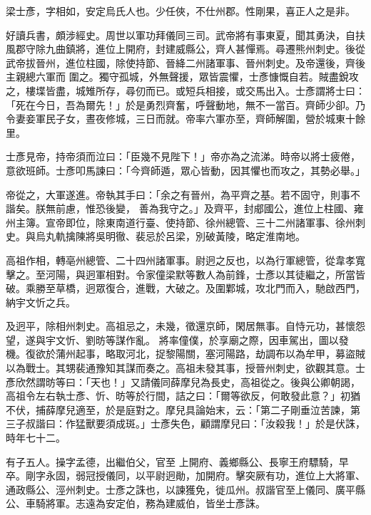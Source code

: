 
\begin{pinyinscope}

 梁士彥，字相如，安定烏氏人也。少任俠，不仕州郡。性剛果，喜正人之是非。



 好讀兵書，頗涉經史。周世以軍功拜儀同三司。武帝將有事東夏，聞其勇決，自扶風郡守除九曲鎮將，進位上開府，封建威縣公，齊人甚憚焉。尋遷熊州刺史。後從武帝拔晉州，進位柱國，除使持節、晉絳二州諸軍事、晉州刺史。及帝還後，齊後主親總六軍而
 圍之。獨守孤城，外無聲援，眾皆震懼，士彥慷慨自若。賊盡銳攻之，樓堞皆盡，城雉所存，尋仞而已。或短兵相接，或交馬出入。士彥謂將士曰：「死在今日，吾為爾先！」於是勇烈齊奮，呼聲動地，無不一當百。齊師少卻。乃令妻妾軍民子女，晝夜修城，三日而就。帝率六軍亦至，齊師解圍，營於城東十餘里。



 士彥見帝，持帝須而泣曰：「臣幾不見陛下！」帝亦為之流涕。時帝以將士疲倦，意欲班師。士彥叩馬諫曰：「今齊師遁，眾心皆動，因其懼也而攻之，其勢必舉。」



 帝從之，大軍遂進。帝執其手曰：「余之有晉州，為平齊之基。若不固守，則事不諧矣。朕無前慮，惟恐後變，
 善為我守之。」及齊平，封郕國公，進位上柱國、雍州主簿。宣帝即位，除東南道行臺、使持節、徐州總管、三十二州諸軍事、徐州刺史。與烏丸軌擒陳將吳明徹、裴忌於呂梁，別破黃陵，略定淮南地。



 高祖作相，轉亳州總管、二十四州諸軍事。尉迥之反也，以為行軍總管，從韋孝寬擊之。至河陽，與迥軍相對。令家僮梁默等數人為前鋒，士彥以其徒繼之，所當皆破。乘勝至草橋，迥眾復合，進戰，大破之。及圍鄴城，攻北門而入，馳啟西門，納宇文忻之兵。



 及迥平，除相州刺史。高祖忌之，未幾，徵還京師，閑居無事。自恃元功，甚懷怨望，遂與宇文忻、劉昉等謀作亂。
 將率僮僕，於享廟之際，因車駕出，圖以發機。復欲於蒲州起事，略取河北，捉黎陽關，塞河陽路，劫調布以為牟甲，募盜賊以為戰士。其甥裴通豫知其謀而奏之。高祖未發其事，授晉州刺史，欲觀其意。士彥欣然謂昉等曰：「天也！」又請儀同薛摩兒為長史，高祖從之。後與公卿朝謁，高祖令左右執士彥、忻、昉等於行間，詰之曰：「爾等欲反，何敢發此意？」初猶不伏，捕薛摩兒適至，於是庭對之。摩兒具論始末，云：「第二子剛垂泣苦諫，第三子叔諧曰：作猛獸要須成斑。」士彥失色，顧謂摩兒曰：「汝殺我！」於是伏誅，時年七十二。



 有子五人。操字孟德，出繼伯父，官至
 上開府、義鄉縣公、長寧王府驃騎，早卒。剛字永固，弱冠授儀同，以平尉迥勛，加開府。擊突厥有功，進位上大將軍、通政縣公、涇州刺史。士彥之誅也，以諫獲免，徙瓜州。叔諧官至上儀同、廣平縣公、車騎將軍。志遠為安定伯，務為建威伯，皆坐士彥誅。




\end{pinyinscope}
